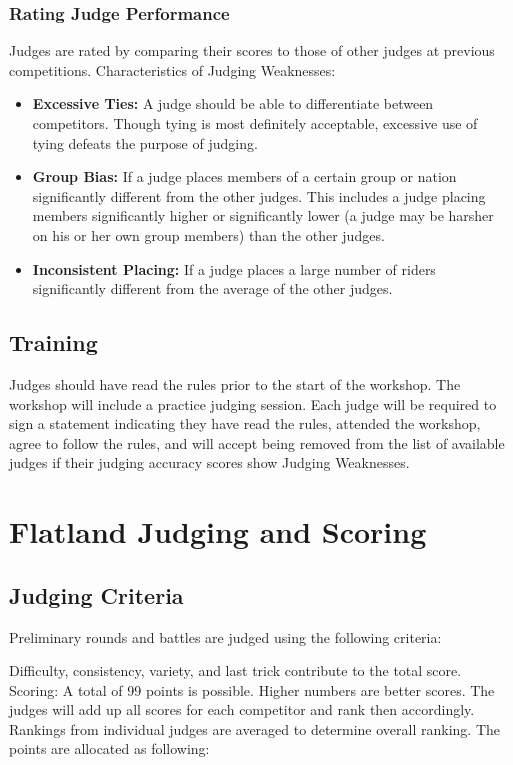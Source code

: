 \subsubsection{Rating Judge Performance}
Judges are rated by comparing their scores to those of other judges at previous competitions.
Characteristics of Judging Weaknesses:
\begin{itemize}
\item \textbf{Excessive Ties:}
A judge should be able to differentiate between competitors.
Though tying is most definitely acceptable, excessive use of tying defeats the purpose of judging.
\item \textbf{Group Bias:}
If a judge places members of a certain group or nation significantly different from the other judges.
This includes a judge placing members significantly higher or significantly lower (a judge may be harsher on his or her own group members) than the other judges.
\item\textbf{Inconsistent Placing:}
If a judge places a large number of riders significantly different from the average of the other judges.
\end{itemize}

\subsection{Training}
Judges should have read the rules prior to the start of the workshop.
The workshop will include a practice judging session.
Each judge will be required to sign a statement indicating they have read the rules, attended the workshop, agree to follow the rules, and will accept being removed from the list of available judges if their judging accuracy scores show Judging Weaknesses.

\section{Flatland Judging and Scoring \label{sec:flat-street_flatland-judging-scoring}}

\subsection{Judging Criteria}

Preliminary rounds and battles are judged using the following criteria:

Difficulty, consistency, variety, and last trick contribute to the total score.
Scoring: A total of 99 points is possible.
Higher numbers are better scores.
The judges will add up all scores for each competitor and rank then accordingly.
Rankings from individual judges are averaged to determine overall ranking.
The points are allocated as following: 

